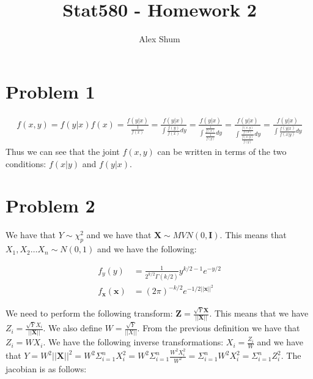 \documentclass{article}\usepackage[]{graphicx}\usepackage[]{color}
\title{Stat580 - Homework 2}
\author{Alex Shum}
\begin{document}
\maketitle

\section{Problem 1}
\begin{align*}
f(x,y) = f(y|x)f(x) = \frac{f(y|x)}{\frac{1}{f(x)}} = \frac{f(y|x)}{\int \frac{f(y)}{f(x)} dy} = \frac{f(y|x)}{\int \frac{\frac{1}{f(x)}}{\frac{1}{f(y)}}dy} = \frac{f(y|x)}{\int \frac{\frac{f(x,y)}{f(x)}}{\frac{f(x,y)}{f(y)}}dy} = \frac{f(y|x)}{\int \frac{f(y|x)}{f(x|y)}dy}
\end{align*}
Thus we can see that the joint $f(x,y)$ can be written in terms of the two conditions: $f(x|y)$ and $f(y|x)$.

\section{Problem 2}
We have that $Y \sim \chi^2_p$ and we have that $\mathbf{X} \sim MVN(0, \mathbf{I})$.  This means that $X_1, X_2 \dots X_n \sim N(0,1)$ and we have the following:

\begin{align*}
f_y(y) &= \frac{1}{2^{k/2}\Gamma(k/2)}y^{k/2 - 1}e^{-y/2} \\
f_\mathbf{x}(\mathbf{x}) &= (2\pi)^{-k/2} e^{-1/2 ||\mathbf{x}||^2}
\end{align*}

We need to perform the following transform: $\mathbf{Z} = \frac{\sqrt{Y} \mathbf{X}}{||\mathbf{X}||}$.  This means that we have $Z_i = \frac{\sqrt{Y} X_i}{||\mathbf{X}||}$.  We also define $W = \frac{\sqrt{Y}}{||X||}$.  From the previous definition we have that $Z_i = WX_i$.  We have the following inverse transformations: $X_i = \frac{Z_i}{W}$ and we have that $Y = W^2||\mathbf{X}||^2 = W^2 \Sigma_{i=1}^n X_i^2 = W^2 \Sigma_{i=1}^n \frac{W^2X_i^2}{W^2} = \Sigma_{i=1}^n W^2X_i^2 = \Sigma_{i=1}^nZ_i^2$.  The jacobian is as follows:
\end{document}
